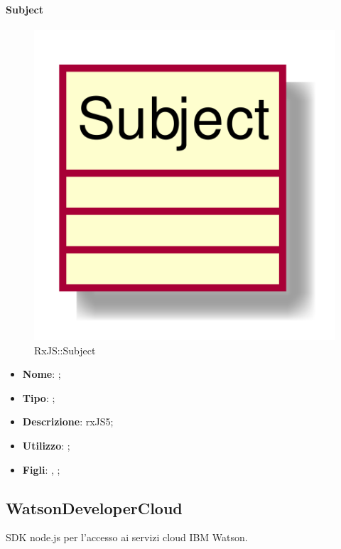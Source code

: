 \hypertarget{Subject_label}{\paragraph{Subject}}
\begin{figure}[h]
	\centering
	\includegraphics[width=\textwidth,height=\textheight,keepaspectratio]{images/ClassSubject.png}
	\caption{RxJS::Subject}
\end{figure}
\begin{itemize}
	\item \textbf{Nome}: ;
	\item \textbf{Tipo}: ;
	\item \textbf{Descrizione}: rxJS5;
	\item \textbf{Utilizzo}: ;
	\item \textbf{Figli}: , ;
\end{itemize}
\FloatBarrier

\subsection{WatsonDeveloperCloud}
SDK node.js per l'accesso ai servizi cloud IBM Watson.
